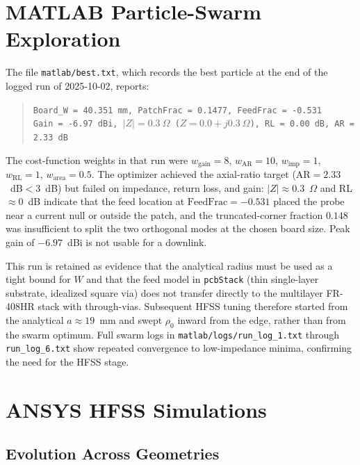 \section{MATLAB Particle-Swarm Exploration}

The file \texttt{matlab/best.txt}, which records the best particle at the end of the logged run of 2025-10-02, reports:

\begin{quote}
\texttt{Board\_W = 40.351~mm, PatchFrac = 0.1477, FeedFrac = -0.531} \\
\texttt{Gain = -6.97~dBi, $|Z| = 0.3~\Omega$ ($Z = 0.0 + j0.3~\Omega$), RL = 0.00~dB, AR = 2.33~dB}
\end{quote}

The cost-function weights in that run were $w_{\mathrm{gain}}=8$, $w_{\mathrm{AR}}=10$, $w_{\mathrm{imp}}=1$, $w_{\mathrm{RL}}=1$, $w_{\mathrm{area}}=0.5$. The optimizer achieved the axial-ratio target (AR${}=2.33$~dB${}<3$~dB) but failed on impedance, return loss, and gain: $|Z|\approx 0.3$~$\Omega$ and RL${}\approx 0$~dB indicate that the feed location at $\mathrm{FeedFrac}=-0.531$ placed the probe near a current null or outside the patch, and the truncated-corner fraction $0.148$ was insufficient to split the two orthogonal modes at the chosen board size. Peak gain of $-6.97$~dBi is not usable for a downlink.

This run is retained as evidence that the analytical radius must be used as a tight bound for $W$ and that the feed model in \texttt{pcbStack} (thin single-layer substrate, idealized square via) does not transfer directly to the multilayer FR-408HR stack with through-vias. Subsequent HFSS tuning therefore started from the analytical $a\approx 19$~mm and swept $\rho_0$ inward from the edge, rather than from the swarm optimum. Full swarm logs in \texttt{matlab/logs/run\_log\_1.txt} through \texttt{run\_log\_6.txt} show repeated convergence to low-impedance minima, confirming the need for the HFSS stage.

\section{ANSYS HFSS Simulations}

\subsection{Evolution Across Geometries}

